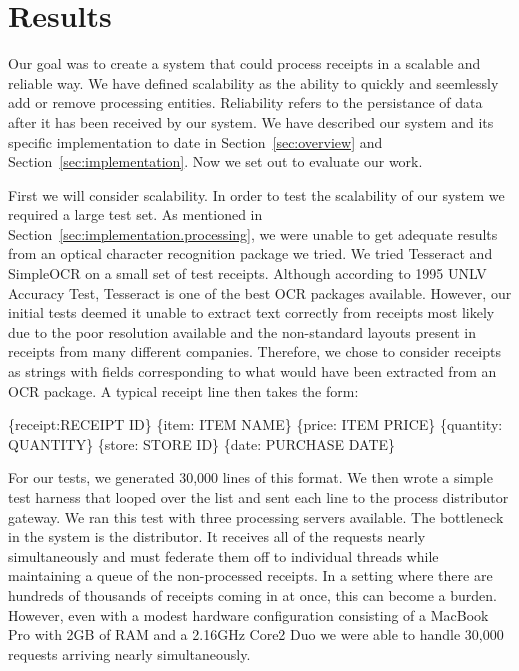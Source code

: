 \section{Results}
\label{sec:results}

Our goal was to create a system that could process receipts in a
scalable and reliable way. We have defined scalability as the ability
to quickly and seemlessly add or remove processing
entities. Reliability refers to the persistance of data after it has
been received by our system. We have described our system and its
specific implementation to date in Section~\ref{sec:overview} and
Section~\ref{sec:implementation}. Now we set out to evaluate our work.

First we will consider scalability. In order to test the scalability
of our system we required a large test set. As mentioned in
Section~\ref{sec:implementation.processing}, we were unable to get
adequate results from an optical character recognition package we
tried. We tried Tesseract and SimpleOCR on a small set of test
receipts. Although according to 1995 UNLV Accuracy Test, Tesseract is
one of the best OCR packages available. However, our initial tests
deemed it unable to extract text correctly from receipts most likely
due to the poor resolution available and the non-standard layouts
present in receipts from many different companies. Therefore, we chose to consider receipts as strings with fields corresponding to what would have been extracted from an OCR package. A typical receipt line then takes the form:

\begin{centering}
\{receipt:RECEIPT ID\} \{item: ITEM NAME\} \{price: ITEM PRICE\} \{quantity: QUANTITY\} \{store: STORE ID\} \{date: PURCHASE DATE\}
\end{centering}

For our tests, we generated 30,000 lines of this format. We then
wrote a simple test harness that looped over the list and sent each
line to the process distributor gateway. We ran this test with three
processing servers available. The bottleneck in the system is the
distributor. It receives all of the requests nearly simultaneously and
must federate them off to individual threads while maintaining a queue
of the non-processed receipts. In a setting where there are hundreds
of thousands of receipts coming in at once, this can become a
burden. However, even with a modest hardware configuration consisting
of a MacBook Pro with 2GB of RAM and a 2.16GHz Core2 Duo we were able
to handle 30,000 requests arriving nearly simultaneously. 

